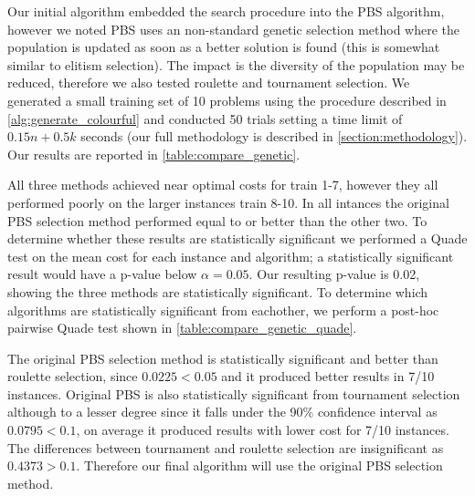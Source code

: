 Our initial algorithm embedded the search procedure into the PBS algorithm, however we noted PBS uses an non-standard genetic selection method where the population is updated as soon as a better solution is found (this is somewhat similar to elitism selection). The impact is the diversity of the population may be reduced, therefore we also tested roulette and tournament selection. We generated a small training set of 10 problems using the procedure described in \cref{alg:generate_colourful} and conducted 50 trials setting a time limit of $0.15n+0.5k$ seconds (our full methodology is described in \cref{section:methodology}). Our results are reported in \cref{table:compare_genetic}.



All three methods achieved near optimal costs for train 1-7, however they all performed poorly on the larger instances train 8-10. In all intances the original PBS selection method performed equal to or better than the other two. To determine whether these results are statistically significant we performed a Quade test on the mean cost for each instance and algorithm; a statistically significant result would have a p-value below $\alpha =0.05$. Our resulting p-value is 0.02, showing the three methods are statistically significant. To determine which algorithms are statistically significant from eachother, we perform a post-hoc pairwise Quade test shown in \cref{table:compare_genetic_quade}.



The original PBS selection method is statistically significant and better than roulette selection, since $0.0225<0.05$ and it produced better results in 7/10 instances. Original PBS is also statistically significant from tournament selection although to a lesser degree since it falls under the 90\% confidence interval as $0.0795<0.1$, on average it produced results with lower cost for 7/10 instances. The differences between tournament and roulette selection are insignificant as $0.4373>0.1$. Therefore our final algorithm will use the original PBS selection method.